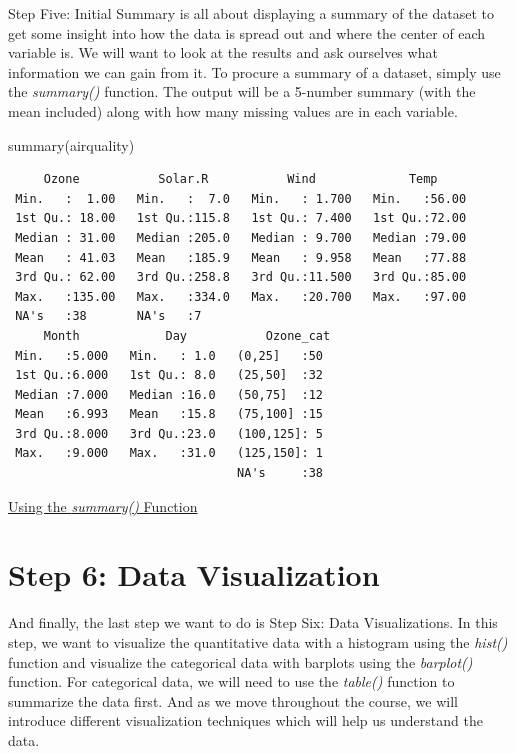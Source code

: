 \documentclass[
  letterpaper,
  DIV=11,
  numbers=noendperiod]{scrreprt}
\newenvironment{Shaded}{\begin{snugshade}}{\end{snugshade}}
\newcommand{\FunctionTok}[1]{\textcolor[rgb]{0.28,0.35,0.67}{#1}}
\newcommand{\NormalTok}[1]{\textcolor[rgb]{0.00,0.23,0.31}{#1}}
\begin{document}
Step Five: Initial Summary is all about displaying a summary of the
dataset to get some insight into how the data is spread out and where
the center of each variable is. We will want to look at the results and
ask ourselves what information we can gain from it. To procure a summary
of a dataset, simply use the \emph{summary()} function. The output will
be a 5-number summary (with the mean included) along with how many
missing values are in each variable.

\begin{Shaded}
\begin{Highlighting}[]
\FunctionTok{summary}\NormalTok{(airquality)}
\end{Highlighting}
\end{Shaded}

\begin{verbatim}
     Ozone           Solar.R           Wind             Temp      
 Min.   :  1.00   Min.   :  7.0   Min.   : 1.700   Min.   :56.00  
 1st Qu.: 18.00   1st Qu.:115.8   1st Qu.: 7.400   1st Qu.:72.00  
 Median : 31.00   Median :205.0   Median : 9.700   Median :79.00  
 Mean   : 41.03   Mean   :185.9   Mean   : 9.958   Mean   :77.88  
 3rd Qu.: 62.00   3rd Qu.:258.8   3rd Qu.:11.500   3rd Qu.:85.00  
 Max.   :135.00   Max.   :334.0   Max.   :20.700   Max.   :97.00  
 NA's   :38       NA's   :7                                       
     Month            Day           Ozone_cat 
 Min.   :5.000   Min.   : 1.0   (0,25]   :50  
 1st Qu.:6.000   1st Qu.: 8.0   (25,50]  :32  
 Median :7.000   Median :16.0   (50,75]  :12  
 Mean   :6.993   Mean   :15.8   (75,100] :15  
 3rd Qu.:8.000   3rd Qu.:23.0   (100,125]: 5  
 Max.   :9.000   Max.   :31.0   (125,150]: 1  
                                NA's     :38  
\end{verbatim}

\begin{watch}{}{}
    \href{https://youtu.be/lDZzsabI2xw}{Using the \textit{summary()} Function}
\end{watch}

\section{Step 6: Data Visualization}\label{step-6-data-visualization}

And finally, the last step we want to do is Step Six: Data
Visualizations. In this step, we want to visualize the quantitative data
with a histogram using the \emph{hist()} function and visualize the
categorical data with barplots using the \emph{barplot()} function. For
categorical data, we will need to use the \emph{table()} function to
summarize the data first. And as we move throughout the course, we will
introduce different visualization techniques which will help us
understand the data.
\end{document}
